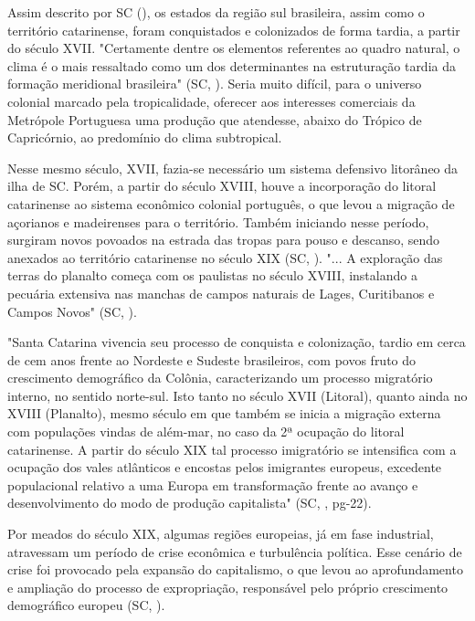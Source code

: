\indent Assim descrito por \acrlong{SC} (\citeyear{AtlasSCpopulacao}), os estados da região sul brasileira, assim como o território catarinense, foram conquistados e colonizados de forma tardia, a partir do século XVII. "Certamente dentre os elementos referentes ao quadro natural, o clima é o mais ressaltado como um dos determinantes na estruturação tardia da formação meridional brasileira" (\acrlong{SC}, \citeyear{AtlasSCpopulacao}). Seria muito difícil, para o universo colonial marcado pela tropicalidade, oferecer aos interesses comerciais da Metrópole Portuguesa uma produção que atendesse, abaixo do Trópico de Capricórnio, ao predomínio do clima subtropical.

\indent Nesse mesmo século, XVII, fazia-se necessário um sistema defensivo litorâneo da ilha de \acrlong{SC}. Porém, a partir do século XVIII, houve a incorporação do litoral catarinense ao sistema econômico colonial português, o que levou a migração de açorianos e madeirenses para o território. Também iniciando nesse período, surgiram novos povoados na estrada das tropas para pouso e descanso, sendo anexados ao território catarinense no século XIX (\acrlong{SC}, \citeyear{AtlasSCterritorio}). "... A exploração das terras do planalto começa com os paulistas no século XVIII, instalando a pecuária extensiva nas manchas de campos naturais de Lages, Curitibanos e Campos Novos" (\acrlong{SC}, \citeyear{AtlasSCpopulacao}).

\begin{citacao}
"Santa Catarina vivencia seu processo de conquista e colonização, tardio em cerca de cem anos frente ao Nordeste e Sudeste brasileiros, com povos fruto do crescimento demográfico da Colônia, caracterizando um processo migratório interno, no sentido norte-sul. Isto tanto no século XVII (Litoral), quanto ainda no XVIII (Planalto), mesmo século em que também se inicia a migração externa com populações vindas de além-mar, no caso da 2ª ocupação do litoral catarinense. A partir do século XIX tal processo imigratório se intensifica com a ocupação dos vales atlânticos e encostas pelos imigrantes europeus, excedente populacional  relativo a uma Europa em transformação frente ao avanço e desenvolvimento do modo de produção capitalista" (\acrlong{SC}, \citeyear{AtlasSCpopulacao}, pg-22). 
\end{citacao}

\indent Por meados do século XIX, algumas regiões europeias, já em fase industrial, atravessam um período de crise econômica e turbulência política. Esse cenário de crise foi provocado pela expansão do capitalismo, o que levou ao aprofundamento e ampliação do processo de expropriação, responsável pelo próprio crescimento demográfico europeu (\acrlong{SC}, \citeyear{AtlasSCpopulacao}).

